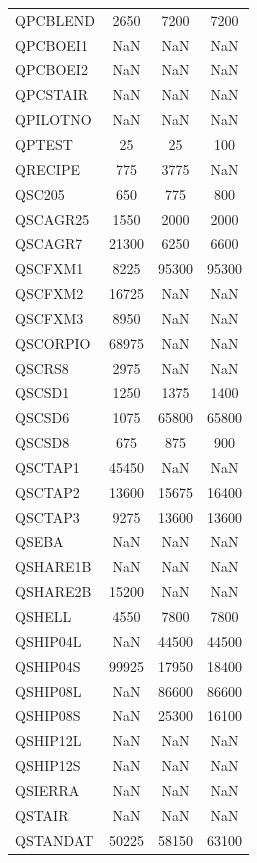 \begin{longtable}{lccc}
QPCBLEND &  2650 &  7200 &   7200 \\
QPCBOEI1 &   NaN &   NaN &    NaN \\
QPCBOEI2 &   NaN &   NaN &    NaN \\
QPCSTAIR &   NaN &   NaN &    NaN \\
QPILOTNO &   NaN &   NaN &    NaN \\
QPTEST   &    25 &    25 &    100 \\
QRECIPE  &   775 &  3775 &    NaN \\
QSC205   &   650 &   775 &    800 \\
QSCAGR25 &  1550 &  2000 &   2000 \\
QSCAGR7  & 21300 &  6250 &   6600 \\
QSCFXM1  &  8225 & 95300 &  95300 \\
QSCFXM2  & 16725 &   NaN &    NaN \\
QSCFXM3  &  8950 &   NaN &    NaN \\
QSCORPIO & 68975 &   NaN &    NaN \\
QSCRS8   &  2975 &   NaN &    NaN \\
QSCSD1   &  1250 &  1375 &   1400 \\
QSCSD6   &  1075 & 65800 &  65800 \\
QSCSD8   &   675 &   875 &    900 \\
QSCTAP1  & 45450 &   NaN &    NaN \\
QSCTAP2  & 13600 & 15675 &  16400 \\
QSCTAP3  &  9275 & 13600 &  13600 \\
QSEBA    &   NaN &   NaN &    NaN \\
QSHARE1B &   NaN &   NaN &    NaN \\
QSHARE2B & 15200 &   NaN &    NaN \\
QSHELL   &  4550 &  7800 &   7800 \\
QSHIP04L &   NaN & 44500 &  44500 \\
QSHIP04S & 99925 & 17950 &  18400 \\
QSHIP08L &   NaN & 86600 &  86600 \\
QSHIP08S &   NaN & 25300 &  16100 \\
QSHIP12L &   NaN &   NaN &    NaN \\
QSHIP12S &   NaN &   NaN &    NaN \\
QSIERRA  &   NaN &   NaN &    NaN \\
QSTAIR   &   NaN &   NaN &    NaN \\
QSTANDAT & 50225 & 58150 &  63100 \\

\end{longtable}

